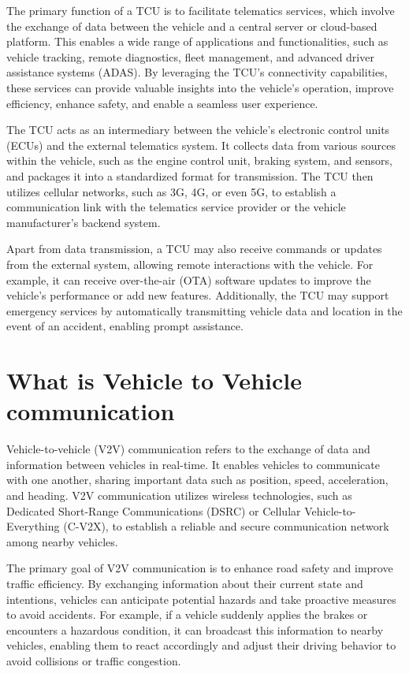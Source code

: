 \documentclass[
12pt,
oneside, 
onehalfspacing, 
nolistspacing, 
parskip, 
chapterinoneline, 
]{AASTCOMPUTER}
\begin{document}
The primary function of a TCU is to facilitate telematics services, which involve the exchange of data between the vehicle and a central server or cloud-based platform. This enables a wide range of applications and functionalities, such as vehicle tracking, remote diagnostics, fleet management, and advanced driver assistance systems (ADAS). By leveraging the TCU's connectivity capabilities, these services can provide valuable insights into the vehicle's operation, improve efficiency, enhance safety, and enable a seamless user experience.

The TCU acts as an intermediary between the vehicle's electronic control units (ECUs) and the external telematics system. It collects data from various sources within the vehicle, such as the engine control unit, braking system, and sensors, and packages it into a standardized format for transmission. The TCU then utilizes cellular networks, such as 3G, 4G, or even 5G, to establish a communication link with the telematics service provider or the vehicle manufacturer's backend system.

Apart from data transmission, a TCU may also receive commands or updates from the external system, allowing remote interactions with the vehicle. For example, it can receive over-the-air (OTA) software updates to improve the vehicle's performance or add new features. Additionally, the TCU may support emergency services by automatically transmitting vehicle data and location in the event of an accident, enabling prompt assistance.
\newpage
\section{What is Vehicle to Vehicle communication}

Vehicle-to-vehicle (V2V) communication refers to the exchange of data and information between vehicles in real-time. It enables vehicles to communicate with one another, sharing important data such as position, speed, acceleration, and heading. V2V communication utilizes wireless technologies, such as Dedicated Short-Range Communications (DSRC) or Cellular Vehicle-to-Everything (C-V2X), to establish a reliable and secure communication network among nearby vehicles.

The primary goal of V2V communication is to enhance road safety and improve traffic efficiency. By exchanging information about their current state and intentions, vehicles can anticipate potential hazards and take proactive measures to avoid accidents. For example, if a vehicle suddenly applies the brakes or encounters a hazardous condition, it can broadcast this information to nearby vehicles, enabling them to react accordingly and adjust their driving behavior to avoid collisions or traffic congestion.
\end{document}
